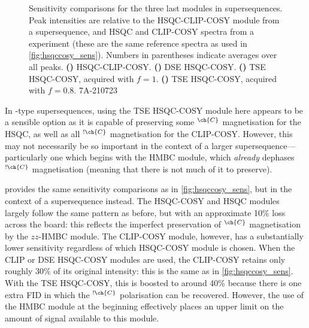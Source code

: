 \documentclass[a4paper,12pt]{article}
\newcommand{\magn}[1]{\ch{^1H}$^{\ch{#1}}$}
\newcommand{\magnnot}[1]{\ch{^1H}$^{!\ch{#1}}$}
\begin{document}
\begin{refsection}
\begin{figure}[!ht]
{        Sensitivity comparisons for the three last modules in  supersequences.
        Peak intensities are relative to the HSQC-CLIP-COSY module from a  supersequence, and HSQC and CLIP-COSY spectra from a  experiment (these are the same reference spectra as used in \cref{fig:hsqccosy_sens}).
        Numbers in parentheses indicate averages over all peaks.
        \textbf{()} HSQC-CLIP-COSY.
        \textbf{()} DSE HSQC-COSY.
        \textbf{()} TSE HSQC-COSY, acquired with $f = 1$.
        \textbf{()} TSE HSQC-COSY, acquired with $f = 0.8$.
        7A-210723
    }
    \label{fig:hsqccosy_sens_with_hmbc}
\end{figure}

In -type supersequences, using the TSE HSQC-COSY module here appears to be a sensible option as it is capable of preserving some \magn{C} magnetisation for the HSQC, as well as all \magnnot{C} magnetisation for the CLIP-COSY.
However, this may not necessarily be so important in the context of a larger supersequence---particularly one which begins with the HMBC module, which \textit{already} dephases \magnnot{C} magnetisation (meaning that there is not much of it to preserve).

 provides the same sensitivity comparisons as in \cref{fig:hsqccosy_sens}, but in the context of a  supersequence instead.
The HSQC-COSY and HSQC modules largely follow the same pattern as before, but with an approximate 10\% loss across the board: this reflects the imperfect preservation of \magn{C} magnetisation by the $zz$-HMBC module.
The CLIP-COSY module, however, has a substantially lower sensitivity regardless of which HSQC-COSY module is chosen.
When the CLIP or DSE HSQC-COSY modules are used, the CLIP-COSY retains only roughly 30\% of its original intensity: this is the same as in \cref{fig:hsqccosy_sens}.
With the TSE HSQC-COSY, this is boosted to around 40\% because there is one extra FID in which the \magnnot{C} polarisation can be recovered.
However, the use of the HMBC module at the beginning effectively places an upper limit on the amount of signal available to this module.


\end{refsection}
\end{document}
